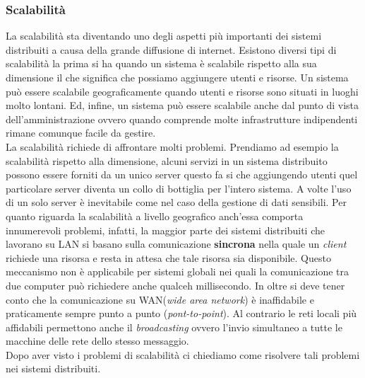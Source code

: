 \subsubsection{Scalabilità}
La scalabilità sta diventando uno degli aspetti più importanti dei sistemi distribuiti a causa della grande diffusione di internet. Esistono diversi tipi di scalabilità la prima si ha quando un sistema è scalabile rispetto alla sua dimensione il che significa che possiamo aggiungere utenti e risorse. Un sistema può essere scalabile geograficamente quando utenti e risorse sono situati in luoghi molto lontani.
Ed, infine, un sistema può essere scalabile anche dal punto di vista dell'amministrazione ovvero quando comprende molte infrastrutture indipendenti rimane comunque facile da gestire.\\
La scalabilità richiede di affrontare molti problemi. Prendiamo ad esempio la scalabilità rispetto alla dimensione, alcuni servizi in un sistema distribuito possono essere forniti da un unico server questo fa si che aggiungendo utenti quel particolare server diventa un collo di bottiglia per l'intero sistema. A volte l'uso di un solo server è inevitabile come nel caso della gestione di dati sensibili.
Per quanto riguarda la scalabilità a livello geografico anch'essa comporta innumerevoli problemi, infatti, la maggior parte dei sistemi distribuiti che lavorano su LAN si basano sulla comunicazione \textbf{sincrona} nella quale un \emph{client} richiede una risorsa e resta in attesa che tale risorsa sia disponibile. Questo meccanismo non è applicabile per sistemi globali nei quali la comunicazione tra due computer può richiedere anche qualceh millisecondo. In oltre si deve tener conto che la comunicazione su WAN(\emph{wide area network}) è inaffidabile e praticamente sempre punto a punto (\emph{pont-to-point}). Al contrario le reti locali più affidabili permettono anche il \emph{broadcasting} ovvero l'invio simultaneo a tutte le macchine delle rete dello stesso messaggio.\\
Dopo aver visto i problemi di scalabilità ci chiediamo come risolvere tali problemi nei sistemi distribuiti.